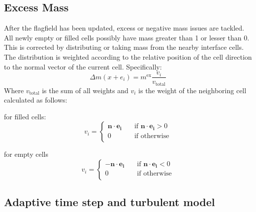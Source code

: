 \documentclass[10pt,a4paper,notitlepage]{article}
\begin{document}
\subsection{Excess Mass }

After the flagfield has been updated, excess or negative mass issues are tackled. All newly empty or filled cells possibly have mass greater than 1 or lesser than 0. This is corrected by distributing or taking mass from the nearby interface cells. The distribution is weighted according to the relative position of the cell direction to the normal vector of the current cell. Specifically:
\begin{equation} \label{eq:exmass}
\Delta m(x+e_{i})=m^{\text{ex}}\frac{v_{i}}{v_{\text{total}}}
\end{equation}
Where $v_{\text{total}}$ is the sum of all weights and $v_{i}$ is the weight of the neighboring cell calculated as follows:

for filled cells:
\begin{equation} \label{eq:filledweight}
  v_i = 
  \begin{cases}
    \mathbf{n \cdot e_{i}}     & \quad \text{if }  \text{$\mathbf{n \cdot e_{i}}>0$}\\
    0			 & \quad \text{if }  \text{otherwise}\\
  \end{cases}
\end{equation}

for empty cells
\begin{equation} \label{eq:emptyweight}
  v_i = 
  \begin{cases}
    -\mathbf{n \cdot e_{i}}     & \quad \text{if }  \text{$\mathbf{n \cdot e_{i}}<0$}\\
    0			  & \quad \text{if }  \text{otherwise}\\
  \end{cases}
\end{equation}

\subsection{Adaptive time step and turbulent model}
\end{document}
